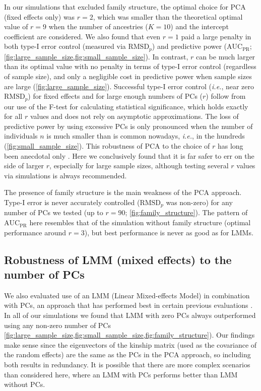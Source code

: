 \documentclass[11pt]{article}
\newcommand{\rmsd}{\text{RMSD}_p}
\newcommand{\auc}{\text{AUC}_\text{PR}}
\begin{document}
In our simulations that excluded family structure, the optimal choice for PCA (fixed effects only) was $r = 2$, which was smaller than the theoretical optimal value of $r=9$ when the number of ancestries ($K=10$) and the intercept coefficient are considered.
We also found that even $r = 1$ paid a large penalty in both type-I error control (measured via $\rmsd$) and predictive power ($\auc$; \cref{fig:large_sample_size,fig:small_sample_size}).
In contrast, $r$ can be much larger than its optimal value with no penalty in terms of type-I error control (regardless of sample size), and only a negligible cost in predictive power when sample sizes are large (\cref{fig:large_sample_size}).
Successful type-I error control (\textit{i.e.}, near zero $\rmsd$) for fixed effects and for large enough numbers of PCs ($r$) follow from our use of the F-test for calculating statistical significance, which holds exactly for all $r$ values and does not rely on asymptotic approximations.
The loss of predictive power by using excessive PCs is only pronounced when the number of individuals $n$ is much smaller than is common nowadays, \textit{i.e.}, in the hundreds (\cref{fig:small_sample_size}).
This robustness of PCA to the choice of $r$ has long been anecdotal only \citep{price_principal_2006, kang_variance_2010}.
Here we conclusively found that it is far safer to err on the side of larger $r$, especially for large sample sizes, although testing several $r$ values via simulations is always recommended.

The presence of family structure is the main weakness of the PCA approach.
Type-I error is never accurately controlled ($\rmsd$ was non-zero) for any number of PCs we tested (up to $r=90$; \cref{fig:family_structure}).
The pattern of $\auc$ here resembles that of the simulation without family structure (optimal performance around $r = 3$), but best performance is never as good as for LMMs.

\subsection{Robustness of LMM (mixed effects) to the number of PCs}

We also evaluated use of an LMM (Linear Mixed-effects Model) in combination with PCs, an approach that has performed best in certain previous evaluations \citep{zhao_arabidopsis_2007, price_new_2010}.
In all of our simulations we found that LMM with zero PCs always outperformed using any non-zero number of PCs \cref{fig:large_sample_size,fig:small_sample_size,fig:family_structure}).
Our findings make sense since the eigenvectors of the kinship matrix (used as the covariance of the random effects) are the same as the PCs in the PCA approach, so including both results in redundancy.
It is possible that there are more complex scenarios than considered here, where an LMM with PCs performs better than LMM without PCs.
\end{document}
